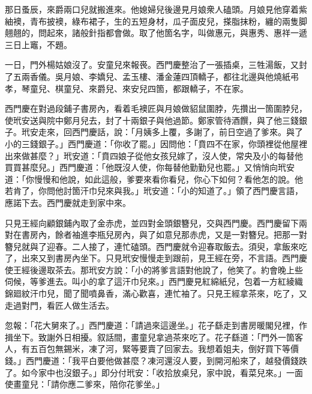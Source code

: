 那日蚤辰，來爵兩口兒就搬進來。他媳婦兒後邊見月娘衆人磕頭。月娘見他穿着紫紬襖，青布披襖，綠布裙子，生的五短身材，瓜子面皮兒，搽脂抹粉，纏的兩隻脚翹翹的，問起來，諸般針指都會做。取了他箇名字，叫做惠元，與惠秀、惠祥一遞三日上竈，不題。

一日，門外楊姑娘沒了。安童兒來報䘮。西門慶整治了一張插桌，三牲湯飯，又封了五兩香儀。吳月娘、李嬌兒、孟玉樓、潘金蓮四頂轎子，都往北邊與他燒紙弔孝，琴童兒、棋童兒、來爵兒、來安兒四箇，都跟轎子，不在家。

西門慶在對過段鋪子書房內，看着毛襖匠與月娘做貂鼠圍脖，先攢出一箇圍脖兒，使玳安送與院中鄭月兒去，封了十兩銀子與他過節。鄭家管待酒饌，與了他三錢銀子。玳安走來，回西門慶話，說：「月姨多上覆，多謝了，前日空過了爹來。與了小的三錢銀子。」西門慶道：「你收了罷。」因問他：「賁四不在家，你頭裡從他屋裡出來做甚麼？」玳安道：「賁四娘子從他女孩兒嫁了，沒人使，常央及小的每替他買買甚麼兒。」西門慶道：「他既沒人使，你每替他勤勤兒也罷。」又悄悄向玳安道：「你慢慢和他說，如此這般，爹要來看你看兒，你心下如何？看他怎的說。他若肯了，你問他討箇汗巾兒來與我。」玳安道：「小的知道了。」領了西門慶言語，應諾下去。西門慶就走到家中來。

只見王經向顧銀鋪內取了金赤虎，並四對金頭銀簪兒，交與西門慶。西門慶留下兩對在書房內，餘者袖進李瓶兒房內，與了如意兒那赤虎，又是一對簪兒。把那一對簪兒就與了迎春。二人接了，連忙磕頭。西門慶就令迎春取飯去。須臾，拿飯來吃了，出來又到書房內坐下。只見玳安慢慢走到跟前，見王經在旁，不言語。西門慶使王經後邊取茶去。那玳安方說：「小的將爹言語對他說了，他笑了。約會晚上些伺候，等爹進去。叫小的拿了這汗巾兒來。」西門慶見紅綿紙兒，包着一方紅綾織錦廻紋汗巾兒，聞了聞噴鼻香，滿心歡喜，連忙袖了。只見王經拿茶來，吃了，又走過對門，看匠人做生活去。

忽報：「花大舅來了。」西門慶道：「請過來這邊坐。」花子繇走到書房暖閣兒裡，作揖坐下。致謝外日相擾。叙話間，畫童兒拿過茶來吃了。花子繇道：「門外一箇客人，有五百包無錫米，凍了河，緊等要賣了回家去。我想着姐夫，倒好買下等價錢。」西門慶道：「我平白要他做甚麼？凍河還沒人要，到開河船來了，越發價錢跌了。如今家中也沒銀子。」即分付玳安：「收拾放桌兒，家中說，看菜兒來。」一面使畫童兒：「請你應二爹來，陪你花爹坐。」

